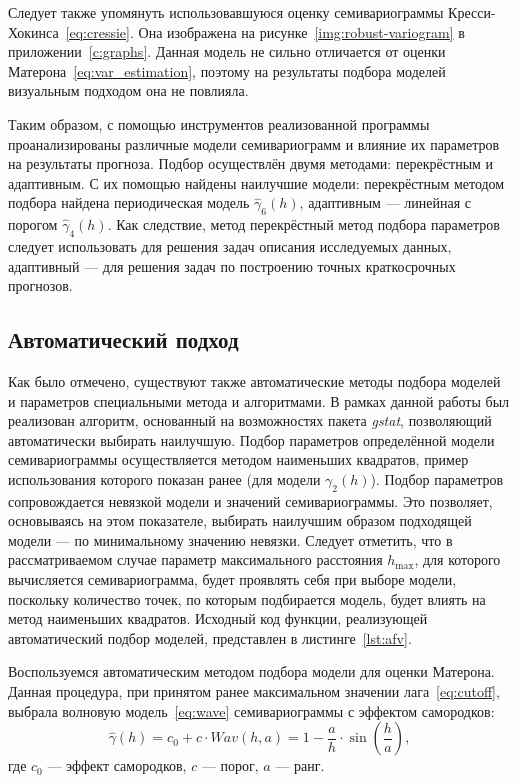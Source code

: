 Следует также упомянуть использовавшуюся оценку семивариограммы Кресси-Хокинса~\eqref{eq:cressie}. Она изображена на рисунке~\ref{img:robust-variogram} в приложении~\ref{c:graphs}. Данная модель не сильно отличается от оценки Матерона~\eqref{eq:var_estimation}, поэтому на результаты подбора моделей визуальным подходом она не повлияла.

Таким образом, с помощью инструментов реализованной программы проанализированы различные модели семивариограмм и влияние их параметров на результаты прогноза. Подбор осуществлён двумя методами: перекрёстным и адаптивным. С их помощью найдены наилучшие модели: перекрёстным методом подбора найдена периодическая модель $ \widehat{\gamma}_6(h) $, адаптивным --- линейная с порогом $ \widehat{\gamma}_4(h) $. Как следствие, метод перекрёстный метод подбора параметров следует использовать для решения задач описания исследуемых данных, адаптивный --- для решения задач по построению точных краткосрочных прогнозов.


\subsection{Автоматический подход} %
\label{sec:autovar}


Как было отмечено, существуют также автоматические методы подбора моделей и параметров специальными метода и алгоритмами. В рамках данной работы был реализован алгоритм, основанный на возможностях пакета \textit{gstat}, позволяющий автоматически выбирать наилучшую. Подбор параметров определённой модели семивариограммы осуществляется методом наименьших квадратов, пример использования которого показан ранее (для модели $ \gamma_2(h) $). Подбор параметров сопровождается невязкой модели и значений семивариограммы. Это позволяет, основываясь на этом показателе, выбирать наилучшим образом подходящей модели --- по минимальному значению невязки. Следует отметить, что в рассматриваемом случае параметр максимального расстояния $ h_{\text{max}} $, для которого вычисляется семивариограмма, будет проявлять себя при выборе модели, поскольку количество точек, по которым подбирается модель, будет влиять на метод наименьших квадратов. Исходный код функции, реализующей автоматический подбор моделей, представлен в листинге~\ref{lst:afv}.

Воспользуемся автоматическим методом подбора модели для оценки Матерона. Данная процедура, при принятом ранее максимальном значении лага~\eqref{eq:cutoff}, выбрала волновую модель~\eqref{eq:wave} семивариограммы с эффектом самородков:
\begin{equation}
\label{eq:wave}
	\widehat{\gamma}(h) = c_0 + c \cdot Wav(h, a) = 1 - \frac{a}{h} \cdot \sin(\frac{h}{a}),
\end{equation}
где $ c_0 $ --- эффект самородков, $ c $ --- порог, $ a $ --- ранг.

